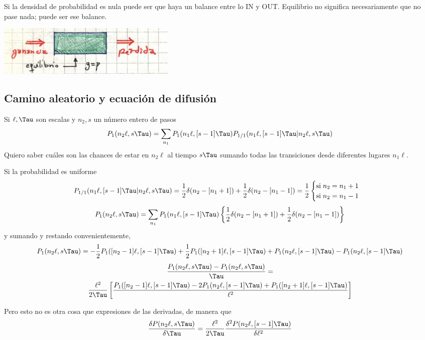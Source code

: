 \documentclass[10pt,oneside]{CBFT_book}
\begin{document}
Si la densidad de probabilidad es nula puede ser que haya un balance entre lo IN y OUT.
Equilibrio no significa necesariamente que no pase nada; puede ser ese balance.


\begin{center}
	\includegraphics[scale=0.5]{images/1606329165.jpg}
\end{center}


\subsection{Camino aleatorio y ecuación de difusión}

Si $\ell, \Tau$ son escalas y $n_2,s$ un número entero de pasos 
\[
	P_1(n_2\ell, s\Tau ) = 
	\sum_{n_1} P_1( n_1\ell, [s-1]\Tau )P_{1/1}( n_1\ell, [s-1]\Tau|n_2\ell, s\Tau )
\]
Quiero saber cuáles son las chances de estar en $n_2\ell$ al tiempo $s\Tau$ sumando todas 
las transiciones desde diferentes lugares $n_1\ell$.

Si la probabilidad es uniforme 
\[
	P_{1/1}(n_1\ell,[s-1]\Tau|n_2\ell,s\Tau) =
	\frac{1}{2}\delta(n_2-[n_1+1]) + \frac{1}{2}\delta(n_2-[n_1-1]) = \frac{1}{2}
	\begin{cases}
	 \text{si} \; n_2 = n_1 + 1 \\
	 \text{si} \; n_2 = n_1 - 1
	\end{cases}
\]
\[
	P_1(n_2\ell,s\Tau) = \sum_{n_1} P_1(n_1\ell,[s-1]\Tau)\left\{
	\frac{1}{2}\delta(n_2-[n_1+1]) + \frac{1}{2}\delta(n_2-[n_1-1])
	\right\}
\]
y sumando y restando convenientemente,
\[
	P_1(n_2\ell,s\Tau) = -\frac{1}{2}P_1([n_2-1]\ell,[s-1]\Tau) + 
\frac{1}{2}P_1([n_2+1]\ell,[s-1]\Tau)
	+ P_1(n_2\ell,[s-1]\Tau) - P_1(n_2\ell,[s-1]\Tau)
\]
\begin{multline}
	\frac{P_1(n_2\ell,s\Tau) - P_1(n_2\ell,s\Tau)}{\Tau} = \\
	\frac{\ell^2}{2\Tau} \left[ \frac{ P_1([n_2-1]\ell,[s-1]\Tau) - 
2P_1(n_2\ell,[s-1]\Tau) + P_1([n_2+1]\ell,[s-1]\Tau) }{\ell^2} \right] 
\end{multline}


Pero esto no es otra cosa que expresiones de las derivadas, de manera que
\[
	\frac{\delta P(n_2\ell,s\Tau)}{\delta \Tau} =
	\frac{\ell^2}{2\Tau} \frac{\delta^2 P(n_2\ell,[s-1]\Tau)}{\delta\ell^2}
\]
\end{document}
